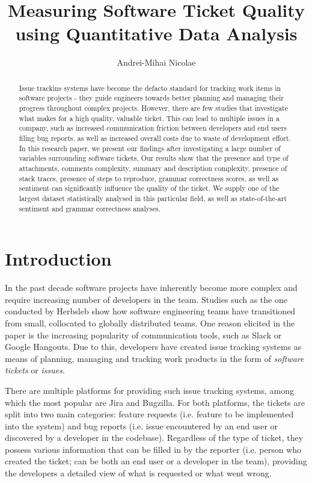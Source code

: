 \documentclass{mpaper}
\begin{document}
\title{Measuring Software Ticket Quality using Quantitative Data Analysis}
\author{Andrei-Mihai Nicolae}

\maketitle

\begin{abstract}
Issue trackins systems have become the defacto standard for tracking work items in 
software projects - they guide engineers towards better planning and 
managing their progress throughout complex projects. However, there
are few studies that investigate what makes for a high quality,
valuable ticket. This can lead to multiple issues in a company, such as 
increased communication friction between developers and end users filing bug
reports, as well as increased overall costs due to waste of development effort. 
In this research paper, we present our findings after 
investigating a large number of variables surrounding software tickets, 
Our results show that the presence and type of attachments,
comments complexity, summary and description complexity, presence of stack traces, presence
of steps to reproduce, grammar correctness scores, as well as sentiment can significantly influence 
the quality of the ticket. We supply one of the largest dataset statistically 
analysed in this particular field, as well as state-of-the-art sentiment and grammar correctness analyses.
\end{abstract}

\section{Introduction}\label{intro}

In the past decade software projects have inherently become more complex and require increasing number of developers in
the team. Studies such as the one conducted by Herbsleb \cite{herbsleb2007global} show how software engineering teams have 
transitioned from small, collocated to globally distributed teams. One reason elicited in the paper is the increasing 
popularity of communication tools, such as Slack or Google Hangouts. Due to this, developers have created issue tracking 
systems as means of planning, managing and tracking work products in the form of \emph{software tickets} or \emph{issues}.

There are multiple platforms for providing such issue tracking systems, among which
the most popular are Jira and Bugzilla. For both platforms,
the tickets are split into two main categories: feature requests (i.e. feature to be 
implemented into the system) and bug reports (i.e. issue encountered by an end user or
discovered by a developer in the codebase). Regardless of the type of ticket, they possess
various information that can be filled in by the reporter (i.e. person who created the ticket; 
can be both an end user or a developer in the team), providing the developers
a detailed view of what is requested or what went wrong.
\end{document}
